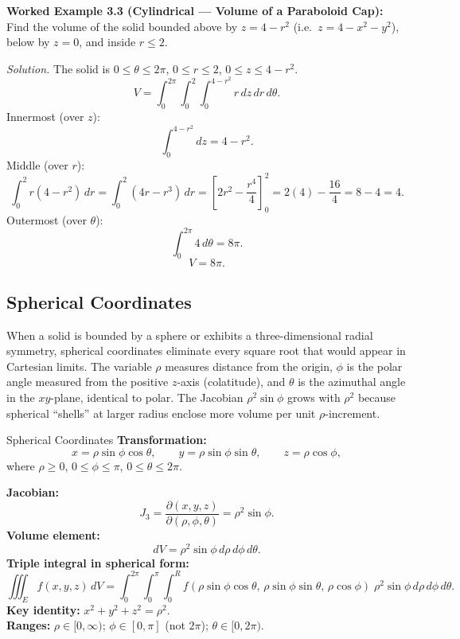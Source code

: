 \documentclass[12pt,a4paper]{article}
\begin{document}
\textbf{Worked Example 3.3 (Cylindrical --- Volume of a Paraboloid Cap):}
Find the volume of the solid bounded above by $z = 4 - r^2$ (i.e.\ $z = 4 - x^2 - y^2$),
below by $z = 0$, and inside $r \leq 2$.

\textit{Solution.}  The solid is $0 \leq \theta \leq 2\pi$, $0 \leq r \leq 2$, $0 \leq z \leq 4-r^2$.
\[
  V = \int_0^{2\pi}\int_0^2\int_0^{4-r^2} r\,dz\,dr\,d\theta.
\]
Innermost (over $z$):
\[
  \int_0^{4-r^2} dz = 4 - r^2.
\]
Middle (over $r$):
\[
  \int_0^2 r(4 - r^2)\,dr = \int_0^2 (4r - r^3)\,dr
  = \left[2r^2 - \frac{r^4}{4}\right]_0^2 = 2(4) - \frac{16}{4} = 8 - 4 = 4.
\]
Outermost (over $\theta$):
\[
  \int_0^{2\pi} 4\,d\theta = 8\pi.
\]
\[
  \boxed{V = 8\pi.}
\]

\subsection{Spherical Coordinates}

When a solid is bounded by a sphere or exhibits a three-dimensional radial symmetry, spherical
coordinates eliminate every square root that would appear in Cartesian limits. The variable $\rho$
measures distance from the origin, $\phi$ is the polar angle measured from the positive $z$-axis
(colatitude), and $\theta$ is the azimuthal angle in the $xy$-plane, identical to polar. The
Jacobian $\rho^2\sin\phi$ grows with $\rho^2$ because spherical ``shells'' at larger radius enclose
more volume per unit $\rho$-increment.

\begin{infobox}{Spherical Coordinates}
\textbf{Transformation:}
\[
  x = \rho\sin\phi\cos\theta, \qquad y = \rho\sin\phi\sin\theta, \qquad z = \rho\cos\phi,
\]
where $\rho \geq 0$, $0 \leq \phi \leq \pi$, $0 \leq \theta \leq 2\pi$.

\textbf{Jacobian:}
\[
  J_3 = \frac{\partial(x,y,z)}{\partial(\rho,\phi,\theta)} = \rho^2\sin\phi.
\]
\textbf{Volume element:}
\[
  dV = \rho^2\sin\phi\,d\rho\,d\phi\,d\theta.
\]
\textbf{Triple integral in spherical form:}
\[
  \iiint_E f(x,y,z)\,dV
  = \int_0^{2\pi}\int_0^{\pi}\int_0^{R}
      f(\rho\sin\phi\cos\theta,\,\rho\sin\phi\sin\theta,\,\rho\cos\phi)\;
      \rho^2\sin\phi\,d\rho\,d\phi\,d\theta.
\]
\textbf{Key identity:} $x^2 + y^2 + z^2 = \rho^2$.\\
\textbf{Ranges:} $\rho \in [0,\infty)$; $\phi \in [0,\pi]$ (not $2\pi$); $\theta \in [0,2\pi)$.
\end{infobox}
\end{document}
